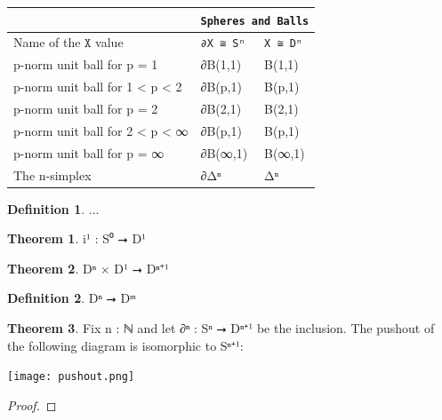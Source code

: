 \documentclass{book}
\theoremstyle{definition}
\newtheorem{definition}{Definition}
\newtheorem{theorem}{Theorem}
\begin{document}
{
\footnotesize
\begin{center}
\begin{tabular}{||l || l || l ||} 
 \hline
  & \multicolumn{2}{||c||}{\texttt{Spheres and Balls}} \\
 \hline
 Name of the $\texttt{X}$ value & \texttt{∂X ≅ Sⁿ} & \texttt{X ≅ Dⁿ} \\
 \hline
 \hline
 p-norm unit ball for p = 1 & ∂B(1,1) & B(1,1) \\
 \hline
 p-norm unit ball for 1 < p < 2 & ∂B(p,1) & B(p,1) \\
 \hline
 p-norm unit ball for p = 2 & ∂B(2,1) & B(2,1) \\
 \hline
 p-norm unit ball for 2 < p < ∞ & ∂B(p,1) & B(p,1) \\
 \hline
 p-norm unit ball for p = ∞ & ∂B(∞,1) & B(∞,1) \\
 \hline
 The n-simplex & ∂Δⁿ & Δⁿ \\
 \hline
 \hline
\end{tabular}
\end{center}
}

\begin{definition}
...
\end{definition}

\begin{theorem}
i¹ : S⁰ ⭢ D¹ 
\end{theorem}

\begin{theorem}
Dⁿ × D¹ ⭢ Dⁿ⁺¹
\end{theorem}

\begin{definition}
Dⁿ ⭢ Dᵐ
\end{definition}


\begin{theorem}
Fix n : ℕ and let ∂ⁿ : Sⁿ ⭢ Dⁿ⁺¹ be the inclusion. The pushout of the following diagram is isomorphic to Sⁿ⁺¹:
\begin{center}
\texttt{[image: pushout.png]}
\end{center}
\end{theorem}

\begin{proof}

\end{proof}
\end{document}
